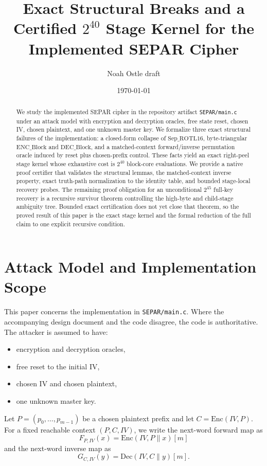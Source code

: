 \documentclass[11pt]{article}
\title{Exact Structural Breaks and a Certified $2^{40}$ Stage Kernel for the Implemented SEPAR Cipher}
\author{Noah Ostle draft}
\date{\today}
\providecommand{\StageKernelBound}{2^{40}}
\providecommand{\FullTargetBound}{2^{45}}
\begin{document}
\maketitle

\begin{abstract}
We study the implemented SEPAR cipher in the repository artifact \texttt{SEPAR/main.c} under an attack model with encryption and decryption oracles, free state reset, chosen IV, chosen plaintext, and one unknown master key. We formalize three exact structural failures of the implementation: a closed-form collapse of \(\mathrm{Sep\_ROTL16}\), byte-triangular \(\mathrm{ENC\_Block}\) and \(\mathrm{DEC\_Block}\), and a matched-context forward/inverse permutation oracle induced by reset plus chosen-prefix control. These facts yield an exact right-peel stage kernel whose exhaustive cost is \(\StageKernelBound\) block-core evaluations. We provide a native proof certifier that validates the structural lemmas, the matched-context inverse property, exact truth-path normalization to the identity table, and bounded stage-local recovery probes. The remaining proof obligation for an unconditional \(\FullTargetBound\) full-key recovery is a recursive survivor theorem controlling the high-byte and child-stage ambiguity tree. Bounded exact certification does not yet close that theorem, so the proved result of this paper is the exact stage kernel and the formal reduction of the full claim to one explicit recursive condition.
\end{abstract}

\section{Attack Model and Implementation Scope}
This paper concerns the implementation in \texttt{SEPAR/main.c}. Where the accompanying design document and the code disagree, the code is authoritative. The attacker is assumed to have:
\begin{itemize}
\item encryption and decryption oracles,
\item free reset to the initial IV,
\item chosen IV and chosen plaintext,
\item one unknown master key.
\end{itemize}

Let \(P=(p_0,\dots,p_{m-1})\) be a chosen plaintext prefix and let \(C=\mathrm{Enc}(IV,P)\). For a fixed reachable context \((P,C,IV)\), we write the next-word forward map as
\[
F_{P,IV}(x)=\mathrm{Enc}(IV,P\|x)[m]
\]
and the next-word inverse map as
\[
G_{C,IV}(y)=\mathrm{Dec}(IV,C\|y)[m].
\]
\end{document}
